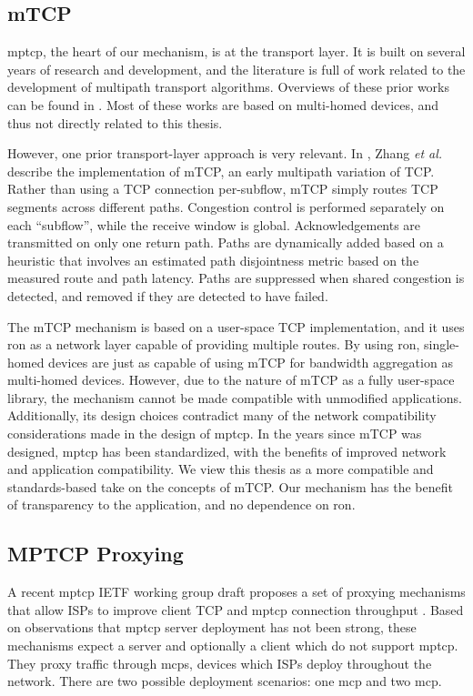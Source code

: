 \documentclass{cwru}
\begin{document}
\subsection{mTCP}
\label{s:rw-transport}

\ac{mptcp}, the heart of our mechanism, is at the transport layer. It is built
on several years of research and development, and the literature is full of work
related to the development of multipath transport algorithms. Overviews of these
prior works can be found in \cite{barre2011multipath,raiciu2012hard}. Most of
these works are based on multi-homed devices, and thus not directly related to
this thesis.

However, one prior transport-layer approach is very relevant. In
\cite{zhang2004transport}, Zhang \textit{et al.} describe the implementation of
mTCP, an early multipath variation of TCP. Rather than using a TCP connection
per-subflow, mTCP simply routes TCP segments across different paths. Congestion
control is performed separately on each ``subflow'', while the receive window is
global. Acknowledgements are transmitted on only one return path. Paths are
dynamically added based on a heuristic that involves an estimated path
disjointness metric based on the measured route and path latency. Paths are
suppressed when shared congestion is detected, and removed if they are detected
to have failed.

The mTCP mechanism is based on a user-space TCP implementation, and it uses
\ac{ron} \cite{ron} as a network layer capable of providing multiple routes. By
using \ac{ron}, single-homed devices are just as capable of using mTCP for
bandwidth aggregation as multi-homed devices. However, due to the nature of mTCP
as a fully user-space library, the mechanism cannot be made compatible with
unmodified applications. Additionally, its design choices contradict many of the
network compatibility considerations made in the design of \ac{mptcp}. In the
years since mTCP was designed, \ac{mptcp} has been standardized, with the
benefits of improved network and application compatibility. We view this thesis
as a more compatible and standards-based take on the concepts of mTCP. Our
mechanism has the benefit of transparency to the application, and no dependence
on \ac{ron}.

\subsection{MPTCP Proxying}

A recent \ac{mptcp} IETF working group draft proposes a set of proxying
mechanisms that allow ISPs to improve client TCP and \ac{mptcp} connection
throughput \cite{boucadair-mptcp-plain-mode-10}. Based on observations that
\ac{mptcp} server deployment has not been strong, these mechanisms expect a
server and optionally a client which do not support \ac{mptcp}. They proxy
traffic through \acp{mcp}, devices which ISPs deploy throughout the network.
There are two possible deployment scenarios: one \ac{mcp} and two \ac{mcp}.
\end{document}
